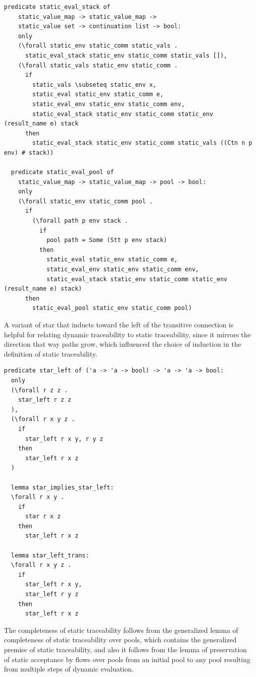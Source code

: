 \documentclass[10pt]{article}
\begin{document}
\begin{lstlisting}[language=logic, mathescape]
  predicate static_eval_stack of
    static_value_map -> static_value_map ->
    static_value set -> continuation list -> bool:
    only 
    (\forall static_env static_comm static_vals .
      static_eval_stack static_env static_comm static_vals []),
    (\forall static_vals static_env static_comm . 
      if 
        static_vals \subseteq static_env x,
        static_eval static_env static_comm e,
        static_eval_env static_env static_comm env,
        static_eval_stack static_env static_comm static_env (result_name e) stack 
      then
        static_eval_stack static_env static_comm static_vals ((Ctn n p env) # stack))

  predicate static_eval_pool of
    static_value_map -> static_value_map -> pool -> bool:
    only
    (\forall static_env static_comm pool .
      if
        (\forall path p env stack .
          if
            pool path = Some (Stt p env stack)
          then 
            static_eval static_env static_comm e,
            static_eval_env static_env static_comm env,
            static_eval_stack static_env static_comm static_env (result_name e) stack)
      then 
        static_eval_pool static_env static_comm pool)
  \end{lstlisting}


A variant of star that inducts toward the left of the transitive connection is helpful for
relating dynamic traceability to static traceability, since it mirrors the direction that way
paths grow, which influenced the choice of induction in the definition of static
traceability.

\begin{lstlisting}[language=logic, mathescape]
  predicate star_left of ('a -> 'a -> bool) -> 'a -> 'a -> bool:
  only
  (\forall r z z .
    star_left r z z
  ),
  (\forall r x y z .
    if
      star_left r x y, r y z
    then
      star_left r x z
  )

  lemma star_implies_star_left:
  \forall r x y .
    if
      star r x z
    then
      star_left r x z

  lemma star_left_trans:
  \forall r x y z .
    if 
      star_left r x y,
      star_left r y z 
    then
      star_left r x z
\end{lstlisting}

The completeness of static traceability follows from the generalized lemma
of completeness of static traceability over pools, which contains
the generalized premise of
static traceability, and also it follows from the lemma of preservation of static
acceptance by flows over pools from an initial pool to any pool resulting from multiple steps of
dynamic evaluation.
\end{document}
